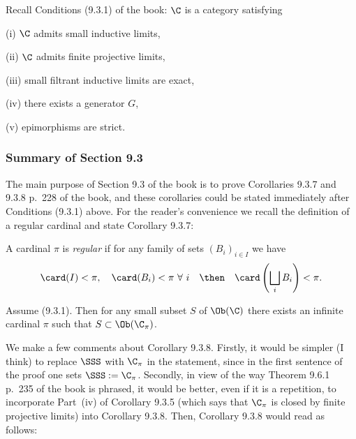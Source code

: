 \documentclass[12pt]{article}
\theoremstyle{remark}
\theoremstyle{definition}
\begin{document}
Recall Conditions (9.3.1) of the book: $\C$ is a category satisfying  

(i) $\C$ admits small inductive limits,

(ii) $\C$ admits finite projective limits,

(iii) small filtrant inductive limits are exact, 

(iv) there exists a generator $G$,

(v) epimorphisms are strict.

\subsubsection{Summary of Section 9.3}

The main purpose of Section 9.3 of the book is to prove Corollaries 9.3.7 and 9.3.8 p.~228 of the book, and these corollaries could be stated immediately after Conditions (9.3.1) above. For the reader's convenience we recall the definition of a regular cardinal and state Corollary 9.3.7:

\begin{df} 
A cardinal $\pi$ is \emph{regular} if for any family of sets $(B_i)_{i\in I}$ we have 
$$
\card(I)<\pi,\quad\card(B_i)<\pi\ \forall\ i\quad\then\quad\card\left(\bigsqcup_iB_i\right)<\pi.
$$
\end{df}

\begin{cor}[Corollary 9.3.7 p. 228]
Assume (9.3.1). Then for any small subset $S$ of $\Ob(\C)$ there exists an infinite cardinal $\pi$ such that $S\subset\Ob(\C_\pi)$.
\end{cor}

We make a few comments about Corollary 9.3.8. Firstly, it would be simpler (I think) to replace $\SSS$ with $\C_\pi$ in the statement, since in the first sentence of the proof one sets $\SSS:=\C_\pi$. Secondly, in view of the way Theorem 9.6.1 p.~235 of the book is phrased, it would be better, even if it is a repetition, to incorporate Part~(iv) of Corollary 9.3.5 (which says that $\C_\pi$ is closed by finite projective limits) into Corollary 9.3.8. Then, Corollary 9.3.8 would read as follows:
\end{document}

